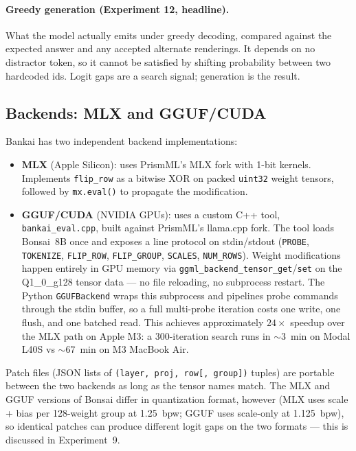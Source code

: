 \documentclass[11pt,a4paper]{article}
\begin{document}
\paragraph{Greedy generation (Experiment 12, headline).}
What the model actually emits under greedy decoding, compared against the
expected answer and any accepted alternate renderings. It depends on no
distractor token, so it cannot be satisfied by shifting probability between two
hardcoded ids. Logit gaps are a search signal; generation is the result.

\subsection{Backends: MLX and GGUF/CUDA}

Bankai has two independent backend implementations:

\begin{itemize}[nosep]
  \item \textbf{MLX} (Apple Silicon): uses PrismML's MLX fork with
    1-bit kernels. Implements \texttt{flip\_row} as a bitwise XOR on
    packed \texttt{uint32} weight tensors, followed by
    \texttt{mx.eval()} to propagate the modification.
  \item \textbf{GGUF/CUDA} (NVIDIA GPUs): uses a custom C++ tool,
    \texttt{bankai\_eval.cpp}, built against PrismML's llama.cpp fork.
    The tool loads Bonsai~8B once and exposes a line protocol on
    stdin/stdout (\texttt{PROBE}, \texttt{TOKENIZE}, \texttt{FLIP\_ROW},
    \texttt{FLIP\_GROUP}, \texttt{SCALES}, \texttt{NUM\_ROWS}).
    Weight modifications happen entirely in GPU memory via
    \texttt{ggml\_backend\_tensor\_get}/\texttt{set} on the
    Q1\_0\_g128 tensor data --- no file reloading, no subprocess
    restart. The Python \texttt{GGUFBackend} wraps this subprocess
    and pipelines probe commands through the stdin buffer, so a full
    multi-probe iteration costs one write, one flush, and one batched
    read. This achieves approximately $24\times$ speedup over the MLX
    path on Apple M3: a 300-iteration search runs in $\sim$3~min
    on Modal L40S vs $\sim$67~min on M3 MacBook Air.
\end{itemize}

Patch files (JSON lists of \texttt{(layer, proj, row[, group])}
tuples) are portable between the two backends as long as the tensor
names match. The MLX and GGUF versions of Bonsai differ in
quantization format, however (MLX uses scale + bias per 128-weight
group at 1.25~bpw; GGUF uses scale-only at 1.125~bpw), so identical
patches can produce different logit gaps on the two formats ---
this is discussed in Experiment~9.
\end{document}
